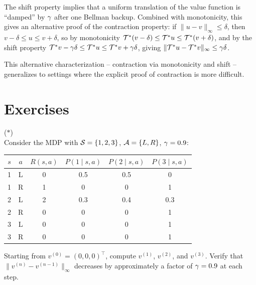 \documentclass[11pt,a4paper]{article}
\begin{document}
\begin{remark}
\label{rem:shift-implication}
The shift property implies that a uniform translation of the value
function is ``damped'' by $\gamma$ after one Bellman backup.
Combined with monotonicity, this gives an alternative proof of the
contraction property: if $\|u - v\|_\infty \leq \delta$, then
$v - \delta \leq u \leq v + \delta$, so by monotonicity
$\mathcal{T}^*(v - \delta) \leq \mathcal{T}^* u \leq
\mathcal{T}^*(v + \delta)$, and by the shift property
$\mathcal{T}^* v - \gamma\delta \leq \mathcal{T}^* u \leq
\mathcal{T}^* v + \gamma\delta$, giving
$\|\mathcal{T}^* u - \mathcal{T}^* v\|_\infty \leq \gamma\delta$.
\end{remark}

This alternative characterization -- contraction via monotonicity
and shift -- generalizes to settings where the explicit proof of
contraction is more difficult.


\section{Exercises}
\label{sec:exercises}

\begin{exercise} \textnormal{(\(*\))} \\
Consider the MDP with $\mathcal{S} = \{1, 2, 3\}$,
$\mathcal{A} = \{L, R\}$, $\gamma = 0.9$:
\begin{center}
\begin{tabular}{cccccc}
\toprule
$s$ & $a$ & $R(s,a)$ & $P(1 \mid s,a)$ & $P(2 \mid s,a)$ &
$P(3 \mid s,a)$ \\
\midrule
1 & L & 0 & 0.5 & 0.5 & 0 \\
1 & R & 1 & 0 & 0 & 1 \\
2 & L & 2 & 0.3 & 0.4 & 0.3 \\
2 & R & 0 & 0 & 0 & 1 \\
3 & L & 0 & 0 & 0 & 1 \\
3 & R & 0 & 0 & 0 & 1 \\
\bottomrule
\end{tabular}
\end{center}
Starting from $v^{(0)} = (0, 0, 0)^\top$, compute $v^{(1)}$,
$v^{(2)}$, and $v^{(3)}$. Verify that $\|v^{(n)} - v^{(n-1)}\|_\infty$
decreases by approximately a factor of $\gamma = 0.9$ at each step.
\end{exercise}
\end{document}
